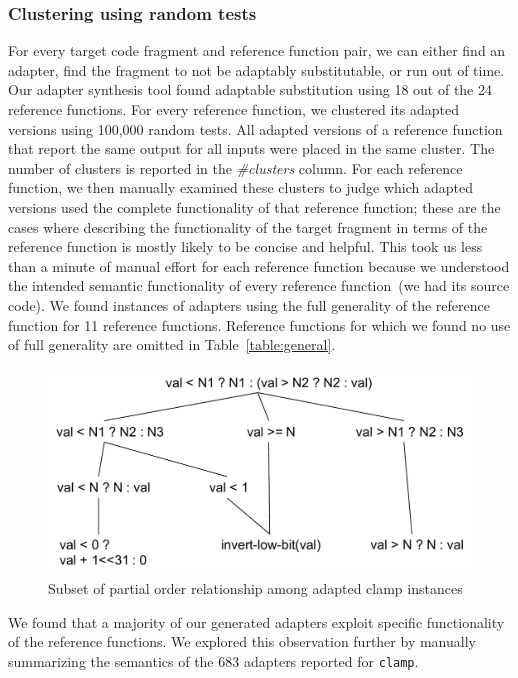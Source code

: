 \subsubsection{Clustering using random tests} For every target code fragment and reference function pair, we can either find an adapter, find the fragment to not be adaptably substitutable, or run out of time.
%
Our adapter synthesis tool found adaptable substitution using 18 out of the 24 reference functions.
%
For every reference function, we clustered its adapted versions using 100,000 random tests. All adapted versions of a reference function that report the same output for all inputs were placed in the same cluster.
%
The number of clusters is reported in the \textit{\#clusters} column.
%
For each reference function, we then manually examined these clusters to judge which adapted versions used the complete functionality of that reference function; these are the cases where describing the functionality of the target fragment in terms of the reference function is mostly likely to be concise and helpful.
%
This took us less than a minute of manual effort for each reference function because we understood the intended semantic functionality of every reference function~(we had its source code).
%
We found instances of adapters using the full generality of the reference function for 11 reference functions.
%
Reference functions for which we found no use of full generality are omitted in Table~\ref{table:general}.
%
\begin{figure}
	\centering
	\includegraphics[width=\widthfactor\columnwidth]{chapters/adapter_synthesis/figures/clamp_partial_order}
	\caption{Subset of partial order relationship among adapted clamp instances}
	\label{fig:clamp_partial_order}
\end{figure}
We found that a majority of our generated adapters exploit specific functionality of the reference functions.
%
We explored this observation further by manually summarizing the semantics of the 683 adapters reported for {\tt clamp}.

